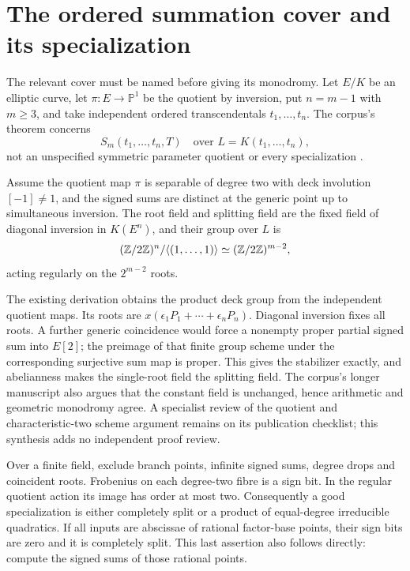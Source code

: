 \section{The ordered summation cover and its specialization}

The relevant cover must be named before giving its monodromy. Let $E/K$
be an elliptic curve, let $\pi:E\to\mathbb P^1$ be the quotient by
inversion, put $n=m-1$ with $m\geq3$, and take independent ordered
transcendentals $t_1,\ldots,t_n$. The corpus's theorem concerns
\[
 S_m(t_1,\ldots,t_n,T)\quad\text{over }L=K(t_1,\ldots,t_n),
\]
not an unspecified symmetric parameter quotient or every specialization
\cite{monodromySource}.

\begin{proposition}
Assume the quotient map $\pi$ is separable of degree two with deck
involution $[-1]\ne1$, and the signed sums are distinct at the generic
point up to simultaneous inversion. The root field and splitting field
are the fixed field of diagonal inversion in $K(E^n)$, and their group
over $L$ is
\[
 (\mathbb Z/2\mathbb Z)^n/\langle(1,\ldots,1)\rangle
       \simeq(\mathbb Z/2\mathbb Z)^{m-2},
\]
acting regularly on the $2^{m-2}$ roots.
\end{proposition}

The existing derivation obtains the product deck group from the
independent quotient maps. Its roots are
$x(\epsilon_1P_1+\cdots+\epsilon_nP_n)$. Diagonal inversion fixes all
roots. A further generic coincidence would force a nonempty proper
partial signed sum into $E[2]$; the preimage of that finite group scheme
under the corresponding surjective sum map is proper. This gives the
stabilizer exactly, and abelianness makes the single-root field the
splitting field. The corpus's longer manuscript also argues that the
constant field is unchanged, hence arithmetic and geometric monodromy
agree. A specialist review of the quotient and characteristic-two
scheme argument remains on its publication checklist; this synthesis
adds no independent proof review.

Over a finite field, exclude branch points, infinite signed sums, degree
drops and coincident roots. Frobenius on each degree-two fibre is a sign
bit. In the regular quotient action its image has order at most two.
Consequently a good specialization is either completely split or a
product of equal-degree irreducible quadratics. If all inputs are
abscissae of rational factor-base points, their sign bits are zero and
it is completely split. This last assertion also follows directly:
compute the signed sums of those rational points.

